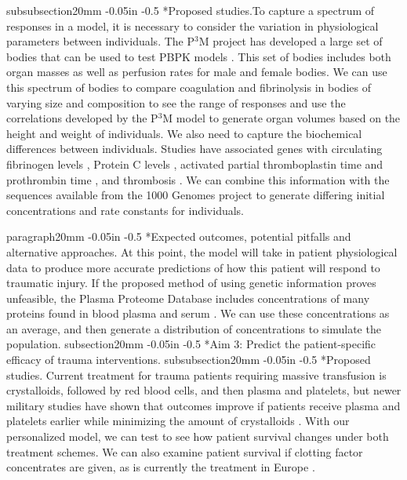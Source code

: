 \documentclass[11pt]{article}
\makeatletter
\renewcommand\subsection{\@startsection
	{subsection}{2}{0mm}
	{-0.05in}
	{-0.5\baselineskip}
	{\normalfont\normalsize\bfseries}}
\renewcommand\subsubsection{\@startsection
	{subsubsection}{2}{0mm}
	{-0.05in}
	{-0.5\baselineskip}
	{\normalfont\normalsize\bfseries}}
\renewcommand\paragraph{\@startsection
  {paragraph}{2}{0mm}
  {-0.05in}
  {-0.5\baselineskip}
  {\normalfont\normalsize\itshape}}
\makeatother
\begin{document}
\subsubsection*{Proposed studies.}To capture a spectrum of responses in a model, it is necessary to consider the variation in physiological parameters between individuals. The P$^3$M project has developed a large set of bodies that can be used to test PBPK models \citep{price2003modeling}. This set of bodies includes both organ masses as well as perfusion rates for male and female bodies. We can use this spectrum of bodies to compare coagulation and fibrinolysis in bodies of varying size and composition to see the range of responses and use the correlations developed by the P$^3$M model to generate organ volumes based on the height and weight of individuals.
We also need to capture the biochemical differences between individuals. Studies have associated genes with circulating fibrinogen levels \cite{dehghan2009association}, Protein C levels \cite{russell2003genetics}, activated partial thromboplastin time and prothrombin time \cite{tang2012genetic}, and thrombosis \cite{lane1996inherited}. We can combine this information with the sequences available from the 1000 Genomes project to generate differing initial concentrations and rate constants for individuals. 

\paragraph*{Expected outcomes, potential pitfalls and alternative approaches.} At this point, the model will take in patient physiological data to produce more accurate predictions of how this patient will respond to traumatic injury.  
If the proposed method of using genetic information proves unfeasible, the Plasma Proteome Database includes concentrations of many proteins found in blood plasma and serum \cite{nanjappa2013plasma}. We can use these concentrations as an average, and then generate a distribution of concentrations to simulate the population.
\subsection*{Aim 3: Predict the patient-specific efficacy of trauma interventions.}
\subsubsection*{Proposed studies.}
Current treatment for trauma patients requiring massive transfusion is crystalloids, followed by red blood cells, and then plasma and platelets, but newer military studies have shown that outcomes improve if patients receive plasma and platelets earlier while minimizing the amount of crystalloids \cite{holcomb2008increased}. With our personalized model, we can test to see how patient survival changes under both treatment schemes. We can also examine patient survival if clotting factor concentrates are given, as is currently the treatment in Europe \citep{hunt2014bleeding}.
\end{document}
